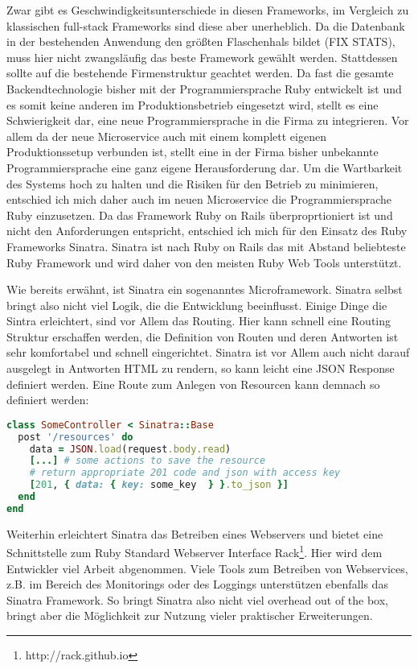 Zwar gibt es Geschwindigkeitsunterschiede in diesen Frameworks\cite[vgl.][]{frameworks}, im Vergleich zu klassischen full-stack Frameworks sind diese aber unerheblich. Da die Datenbank in der bestehenden Anwendung den größten Flaschenhals bildet (FIX STATS), muss hier nicht zwangsläufig das beste Framework gewählt werden. Stattdessen sollte auf die bestehende Firmenstruktur geachtet werden. Da fast die gesamte Backendtechnologie bisher mit der Programmiersprache Ruby entwickelt ist und es somit keine anderen im Produktionsbetrieb eingesetzt wird, stellt es eine Schwierigkeit dar, eine neue Programmiersprache in die Firma zu integrieren. Vor allem da der neue Microservice auch mit einem komplett eigenen Produktionssetup verbunden ist, stellt eine in der Firma bisher unbekannte Programmiersprache eine ganz eigene Herausforderung dar. Um die Wartbarkeit des Systems hoch zu halten und die Risiken für den Betrieb zu minimieren, entschied ich mich daher auch im neuen Microservice die Programmiersprache Ruby einzusetzen. Da das Framework Ruby on Rails überproprtioniert ist und nicht den Anforderungen entspricht, entschied ich mich für den Einsatz des Ruby Frameworks Sinatra. 
Sinatra ist nach Ruby on Rails das mit Abstand beliebteste Ruby Framework\cite[vgl.][]{ruby2015} und wird daher von den meisten Ruby Web Tools unterstützt.

Wie bereits erwähnt, ist Sinatra ein sogenanntes Microframework. Sinatra selbst bringt also nicht viel Logik, die die Entwicklung beeinflusst. Einige Dinge die Sintra erleichtert, sind vor Allem das Routing. Hier kann schnell eine Routing Struktur erschaffen werden, die Definition von Routen und deren Antworten ist sehr komfortabel und schnell eingerichtet. Sinatra ist vor Allem auch nicht darauf ausgelegt in Antworten HTML zu rendern, so kann leicht eine JSON Response definiert werden.
Eine Route zum Anlegen von Resourcen kann demnach so definiert werden:
\begin{lstlisting}[language=Ruby]
class SomeController < Sinatra::Base
  post '/resources' do
    data = JSON.load(request.body.read)
    [...] # some actions to save the resource
    # return appropriate 201 code and json with access key
    [201, { data: { key: some_key  } }.to_json }]
  end
end
\end{lstlisting}

Weiterhin erleichtert Sinatra das Betreiben eines Webservers und bietet eine Schnittstelle zum Ruby Standard Webserver Interface Rack\footnote{http://rack.github.io}. Hier wird dem Entwickler viel Arbeit abgenommen. Viele Tools zum Betreiben von Webservices, z.B. im Bereich des Monitorings oder des Loggings unterstützen ebenfalls das Sinatra Framework. So bringt Sinatra also nicht viel overhead out of the box, bringt aber die Möglichkeit zur Nutzung vieler praktischer Erweiterungen.

